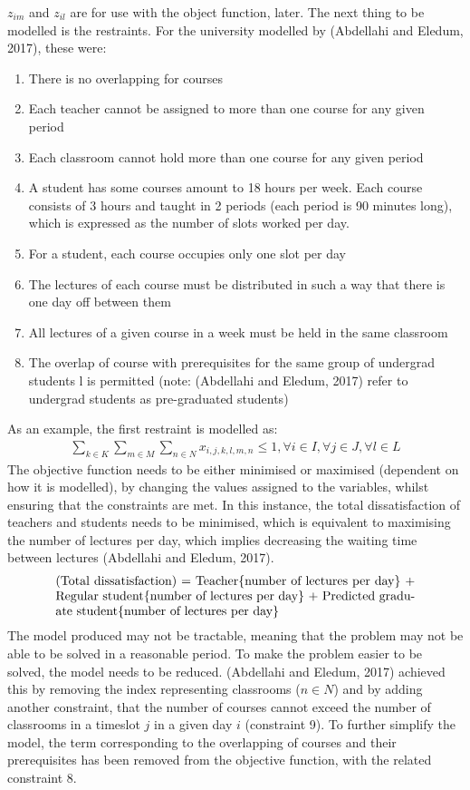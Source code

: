 \documentclass[a4paper, 12pt]{report}
\begin{document}
\( z_{im} \) and \( z_{il} \) are for use with the object function, later. The
next thing to be modelled is the restraints. For the university modelled by
(Abdellahi and Eledum, 2017), these were:

\begin{enumerate}
	\item There is no overlapping for courses
	\item Each teacher cannot be assigned to more than one course for any given
		period
	\item Each classroom cannot hold more than one course for any given period
	\item A student has some courses amount to 18 hours per week. Each course
		consists of 3 hours and taught in 2 periods (each period is 90 minutes
		long), which is expressed as the number of slots worked per day.
	\item For a student, each course occupies only one slot per day
	\item The lectures of each course must be distributed in such a way that
		there is one day off between them
	\item All lectures of a given course in a week must be held in the same
		classroom
	\item The overlap of course with prerequisites for the same group of
		undergrad students l is permitted (note: (Abdellahi and Eledum, 2017)
		refer to undergrad students as pre-graduated students)
\end{enumerate}

As an example, the first restraint is modelled as:
\begin{align*}
	\sum_{k \in K} \sum_{m \in M} \sum_{n \in N} x_{i,j,k,l,m,n} \leq 1,
	\forall i \in I, \forall j \in J, \forall l \in L
\end{align*}
The objective function needs to be either minimised or maximised (dependent on
how it is modelled), by changing the values assigned to the variables, whilst
ensuring that the constraints are met.
In this instance, the total dissatisfaction of teachers and students needs to be
minimised, which is equivalent to maximising the number of lectures per day,
which implies decreasing the waiting time between lectures (Abdellahi and
Eledum, 2017).
\begin{align*}
	\parbox[t]{10cm}{(Total dissatisfaction) = Teacher\{number of lectures per
	day\} + Regular student\{number of lectures per day\} + Predicted graduate
	student\{number of lectures per day\}}
\end{align*}
The model produced may not be tractable, meaning that the problem may not be
able to be solved in a reasonable period.
To make the problem easier to be solved, the model needs to be reduced.
(Abdellahi and Eledum, 2017) achieved this by removing the index representing
classrooms (\( n\in N \)) and by adding another constraint, that the number of
courses cannot exceed the number of classrooms in a timeslot \( j \) in a given
day \( i \) (constraint 9).
To further simplify the model, the term corresponding to the overlapping of
courses and their prerequisites has been removed from the objective function,
with the related constraint 8.
\end{document}
